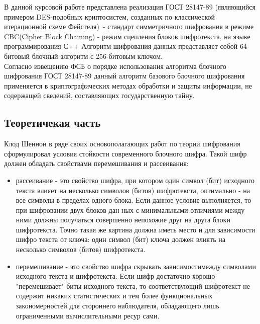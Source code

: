 \documentclass[oneside,final,14pt]{extreport}
\begin{document}
В данной курсовой работе представлена реализация ГОСТ 28147-89 (являющийся примером DES-подобных криптосистем, созданных по классической итерационной схеме Фейстеля)~- стандарт симметричного шифрования в режиме CBC(Cipher Block Chaining) - режим сцепления блоков шифротекста, на языке программирования С++ Алгоритм шифрования данных представляет собой 64-битовый блочный алгоритм с 256-битовым ключом.\\

Согласно извещению ФСБ о порядке использования алгоритма блочного шифрования ГОСТ 28147-89 данный алгоритм базового блочного шифрования применяется в криптографических методах обработки и защиты информации, не содержащей сведений, составляющих государственную тайну.

\newpage
 \begin{center}
\section{Теоретичекая часть}
 \end{center}


Клод Шеннон в ряде своих основополагающих работ по теории
шифрования сформулировал условия стойкости современного блоч­ного шифра. Такой шифр должен обладать свойствами перемеши­вания и рассеивания:\\



\begin{itemize}
\item рассеивание - это свойство шифра, при котором один символ
(бит) исходного текста влияет на несколько символов (битов) шифро­текста, оптимально - на все символы в пределах одного блока. Если
данное условие выполняется, то при шифровании двух блоков дан­ ных с минимальными отличиями между ними должны получаться
совершенно непохожие друг на друга блоки шифротекста. Точно
такая же картина должна иметь место и для зависимости шифро­
текста от ключа: один символ (бит) ключа должен влиять на
несколько символов (битов) шифротекста.
\end{itemize}



\begin{itemize}
\item перемешивание - это свойство шифра скрывать зависимостимежду символами исходного текста и шифротекста. Если шифр достаточно хорошо "перемешивает" биты исходного текста, то соответствующий шифротекст не содержит никаких статистических и
тем более функциональных закономерностей для стороннего наблю­дателя, обладающего лишь ограниченными вычислительными ресур­
сами.
\end{itemize}
\end{document}
